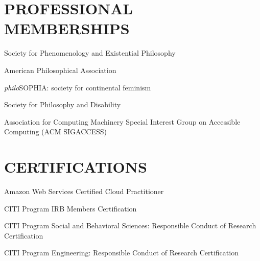 \documentclass{article}
\newcommand{\listitemspace}{0.25em}
\renewenvironment{itemize}
{\begin{list}{}{\setlength{\leftmargin}{0em}
                \setlength{\parskip}{0em}
                \setlength{\itemsep}{\listitemspace}
                \setlength{\parsep}{\listitemspace}}}
{\end{list}}
\begin{document}
\section*{\normalsize{PROFESSIONAL MEMBERSHIPS}}
\begin{itemize}
    \item Society for Phenomenology and Existential Philosophy
    \item American Philosophical Association
    \item \textit{philo}SOPHIA: society for continental feminism
    \item Society for Philosophy and Disability
    \item Association for Computing Machinery \textemdash{} Special Interest Group on Accessible Computing (ACM SIGACCESS)
\end{itemize}

\section*{\normalsize{CERTIFICATIONS}}
\begin{itemize}
    \item Amazon Web Services Certified Cloud Practitioner
    \item CITI Program IRB Members Certification
    \item CITI Program Social and Behavioral Sciences: Responsible Conduct of Research Certification
    \item CITI Program Engineering: Responsible Conduct of Research Certification
\end{itemize}
\end{document}
